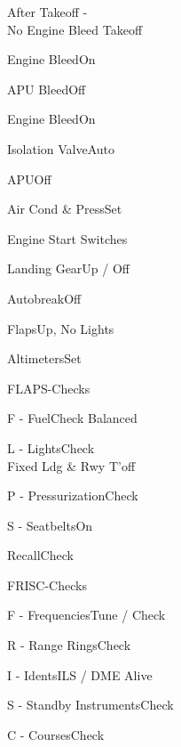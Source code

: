 \documentclass[sim-use]{checklist}
\begin{document}
\begin{checklist}{After Takeoff -\\No Engine Bleed Takeoff}
  \item{Engine  Bleed}{On}
  \item{APU Bleed}{Off}
  \item{Engine  Bleed}{On}
  \item{Isolation Valve}{Auto}
  \item{APU}{Off}
  \item{Air Cond \& Press}{Set}
  \item{Engine Start Switches}{\blank}
  \item{Landing Gear}{Up / Off}
  \item{Autobreak}{Off}
  \item{Flaps}{Up, No Lights}
  \item{Altimeters}{Set}
\end{checklist}

\clearpage

\begin{checklist}{FLAPS-Checks}
  \item{F - Fuel}{Check Balanced}
  \item{L - Lights}{Check\\Fixed Ldg \& Rwy T'off}
  \item{P - Pressurization}{Check}
  \item{S - Seatbelts}{On}
  \item{Recall}{Check}
\end{checklist}

\begin{checklist}{FRISC-Checks}
  \item{F - Frequencies}{Tune / Check}
  \item{R - Range Rings}{Check}
  \item{I - Idents}{ILS / DME Alive}
  \item{S - Standby Instruments}{Check}
  \item{C - Courses}{Check}
\end{checklist}
\end{document}
